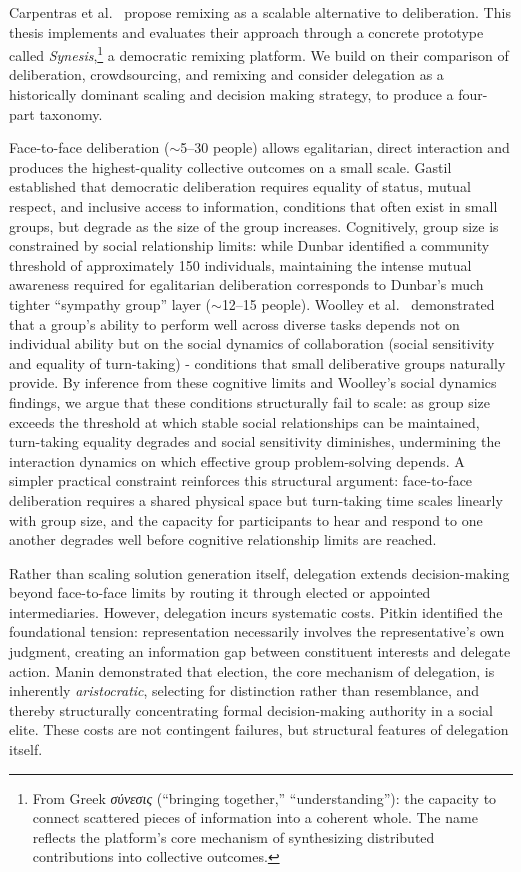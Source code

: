 \documentclass[a4paper, 12pt, twoside]{iviathesis}
\begin{document}
Carpentras et al.\ \cite{carpentras_wisdom_2025} propose remixing as a scalable alternative to deliberation. This thesis implements and evaluates their approach through a concrete prototype called \textit{Synesis},\footnote{From Greek \textit{σύνεσις} (``bringing together,'' ``understanding''): the capacity to connect scattered pieces of information into a coherent whole. The name reflects the platform's core mechanism of synthesizing distributed contributions into collective outcomes.} a democratic remixing platform.
We build on their comparison of deliberation, crowdsourcing, and remixing and consider delegation as a historically dominant scaling and decision making strategy, to produce a four-part taxonomy. 

Face-to-face deliberation ($\sim$5--30 people) allows egalitarian, direct interaction and produces the highest-quality collective outcomes on a small scale. Gastil \cite{gastil1993} established that democratic deliberation requires equality of status, mutual respect, and inclusive access to information, conditions that often exist in small groups, but degrade as the size of the group increases. Cognitively, group size is constrained by social relationship limits: while Dunbar \cite{dunbar1992neocortex} identified a community threshold of approximately 150 individuals, maintaining the intense mutual awareness required for egalitarian deliberation corresponds to Dunbar's much tighter ``sympathy group'' layer ($\sim$12--15 people). 
Woolley et al.\ \cite{woolley2010evidence} demonstrated that a group's ability to perform well across diverse tasks depends not on individual ability but on the social dynamics of collaboration (social sensitivity and equality of turn-taking) - conditions that small deliberative groups naturally provide. By inference from these cognitive limits and Woolley's social dynamics findings, we argue that these conditions structurally fail to scale: as group size exceeds the threshold at which stable social relationships can be maintained, turn-taking equality degrades and social sensitivity diminishes, undermining the interaction dynamics on which effective group problem-solving depends. A simpler practical constraint reinforces this structural argument: face-to-face deliberation requires a shared physical space but turn-taking time scales linearly with group size, and the capacity for participants to hear and respond to one another degrades well before cognitive relationship limits are reached.

Rather than scaling solution generation itself, delegation extends decision-making beyond face-to-face limits by routing it through elected or appointed intermediaries. However, delegation incurs systematic costs. Pitkin \cite{pitkin1967} identified the foundational tension: representation necessarily involves the representative's own judgment, creating an information gap between constituent interests and delegate action. Manin \cite{manin1997} demonstrated that election, the core mechanism of delegation, is inherently \textit{aristocratic}, selecting for distinction rather than resemblance, and thereby structurally concentrating formal decision-making authority in a social elite. These costs are not contingent failures, but structural features of delegation itself.
\end{document}

